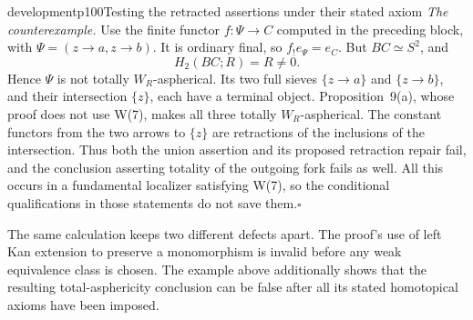 \begin{dcomment}{development}{p100}{Testing the retracted assertions under their stated axiom}
\emph{The counterexample.} Use the finite functor $f:\Psi\to C$ computed in the preceding block, with $\Psi=(z\to a,z\to b)$. It is ordinary final, so $f_!e_\Psi=e_C$. But $BC\simeq S^2$, and
\[
 H_2(BC;R)=R\ne0.
\]
Hence $\Psi$ is not totally $W_R$-aspherical. Its two full sieves $\{z\to a\}$ and $\{z\to b\}$, and their intersection $\{z\}$, each have a terminal object. Proposition~9(a), whose proof does not use W(7), makes all three totally $W_R$-aspherical. The constant functors from the two arrows to $\{z\}$ are retractions of the inclusions of the intersection. Thus both the union assertion and its proposed retraction repair fail, and the conclusion asserting totality of the outgoing fork fails as well. All this occurs in a fundamental localizer satisfying W(7), so the conditional qualifications in those statements do not save them.\hfill$\square$

The same calculation keeps two different defects apart. The proof's use of left Kan extension to preserve a monomorphism is invalid before any weak equivalence class is chosen. The example above additionally shows that the resulting total-asphericity conclusion can be false after all its stated homotopical axioms have been imposed.
\end{dcomment}

